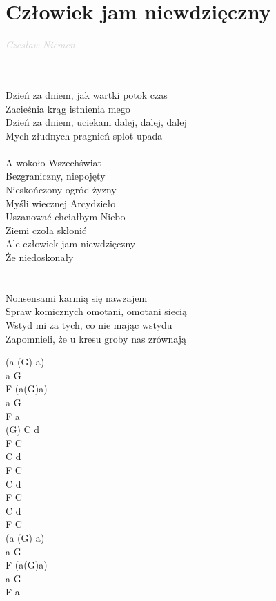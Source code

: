 \documentclass[a5paper, 10pt]{book}
\begin{document}
\section{Człowiek jam niewdzięczny}\textcolor{lightgray}{\textit{Czesław Niemen}}\\~\\
\begin{minipage}[t]{0.6\textwidth}
  ~\\
  Dzień za dniem, jak wartki potok czas\\
  Zacieśnia krąg istnienia mego\\
  Dzień za dniem, uciekam dalej, dalej, dalej\\
  Mych złudnych pragnień splot upada\\
  \\
  \hspace*{5mm}A wokoło Wszechświat\\
  \hspace*{5mm}Bezgraniczny, niepojęty\\
  \hspace*{5mm}Nieskończony ogród żyzny\\
  \hspace*{5mm}Myśli wiecznej Arcydzieło\\
  \hspace*{5mm}Uszanować chciałbym Niebo\\
  \hspace*{5mm}Ziemi czoła skłonić\\
  \hspace*{5mm}Ale człowiek jam niewdzięczny\\
  \hspace*{5mm}Że niedoskonały\\
  \\
  ~\\
  Nonsensami karmią się nawzajem\\
  Spraw komicznych omotani, omotani siecią\\
  Wstyd mi za tych, co nie mając wstydu\\
  Zapomnieli, że u kresu groby nas zrównają\\
\end{minipage}
\begin{minipage}[t]{0.4\textwidth}
  (a (G) a)\\
  a G\\F (a(G)a)\\
  a G\\F a\\

  (G) C d\\F C\\C d\\F C\\
  C d\\F C\\C d\\F C\\

  (a (G) a)\\
  a G\\F (a(G)a)\\
  a G\\F a\\
\end{minipage}
\end{document}
